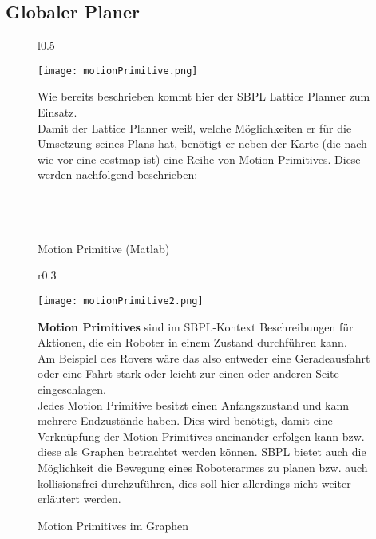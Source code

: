 \documentclass[oribibl]{llncs}
\begin{document}
\subsection{Globaler Planer}
\begin{figure}
\begin{wrapfigure}[10]{l}{0.5\textwidth}
  \begin{center}
  \vspace{-30pt}
    \texttt{[image: motionPrimitive.png]}
    \caption{Motion Primitive (Matlab)}
	\cite{SBPLRosSchool}
  \end{center}
\end{wrapfigure}
Wie bereits beschrieben kommt hier der SBPL Lattice Planner zum Einsatz.\\
Damit der Lattice Planner weiß, welche Möglichkeiten er für die Umsetzung seines Plans hat, benötigt er neben der Karte (die nach wie vor eine costmap ist) eine Reihe von Motion Primitives. Diese werden nachfolgend beschrieben:\\\\\\\\
\end{figure}
\begin{figure}
\begin{wrapfigure}[20]{r}{0.3\textwidth}
  \begin{center}
  \vspace{-30pt}
    \texttt{[image: motionPrimitive2.png]}
    \caption{Motion Primitives im Graphen}
	\cite{SBPLRosSchool}
  \end{center}
\end{wrapfigure}
\textbf{Motion Primitives} sind im SBPL-Kontext Beschreibungen für Aktionen, die ein Roboter in einem Zustand durchführen kann.\\
Am Beispiel des Rovers wäre das also entweder eine Geradeausfahrt oder eine Fahrt stark oder leicht zur einen oder anderen Seite eingeschlagen.\\
Jedes Motion Primitive besitzt einen Anfangszustand und kann mehrere Endzustände haben. Dies wird benötigt, damit eine Verknüpfung der Motion Primitives aneinander erfolgen kann bzw. diese als Graphen betrachtet werden können.
SBPL bietet auch die Möglichkeit die Bewegung eines Roboterarmes zu planen bzw. auch kollisionsfrei durchzuführen, dies soll hier allerdings nicht weiter erläutert werden.
\end{figure}
\end{document}
